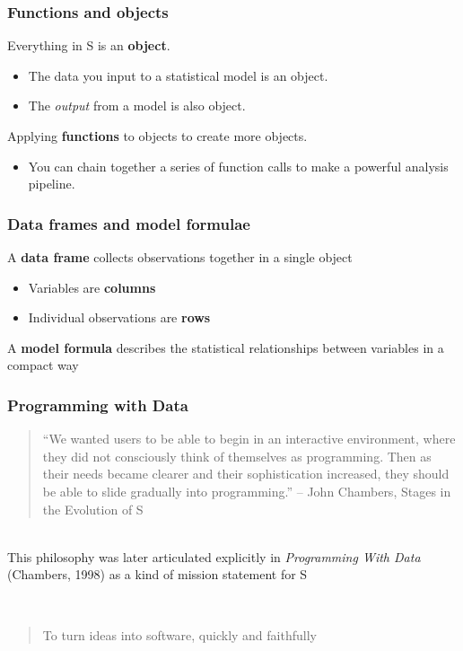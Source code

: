 \documentclass[svgnames, aspectratio=169]{beamer}
\begin{document}
\begin{frame}
  \frametitle{Functions and objects}
  
  Everything in S is an {\bf object}.
  \begin{itemize}
  \item The data you input to a statistical model is an object.
  \item The {\em output} from a model is also object.
  \end{itemize}
  Applying {\bf functions} to objects to create more objects.
  \begin{itemize}
  \item You can chain together a series of function calls to make a powerful analysis pipeline.
  \end{itemize}
  
\end{frame}

\begin{frame}
  \frametitle{Data frames and model formulae}

  A {\bf data frame} collects observations together in a single object
  \begin{itemize}
  \item Variables are {\bf columns}
  \item Individual observations are {\bf rows}
  \end{itemize}
  A {\bf model formula} describes the statistical relationships between
  variables in a compact way

\end{frame}

\begin{frame}
  \frametitle{Programming with Data}

  \begin{quote}
  ``We wanted users to be able to begin in an interactive environment,
  where they did not consciously think of themselves as programming. Then
  as their needs became clearer and their sophistication increased, they
  should be able to slide gradually into programming.''
  -- John Chambers, Stages in the Evolution of S
  \end{quote}

  ~\\
  
  This philosophy was later articulated explicitly in {\em Programming
    With Data} (Chambers, 1998) as a kind of mission statement for S

  ~\\
  
  \begin{quote}
    To turn ideas into software, quickly and faithfully
  \end{quote}
  
\end{frame}
\end{document}
